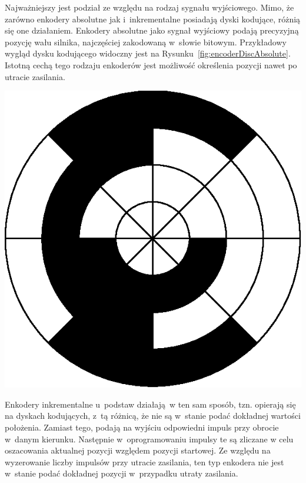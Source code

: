 Najważniejszy jest podział ze względu na rodzaj sygnału wyjściowego. Mimo, że zarówno enkodery absolutne jak i~inkrementalne posiadają dyski kodujące, różnią się one działaniem. Enkodery absolutne jako sygnał wyjściowy podają precyzyjną pozycję wału silnika, najczęściej zakodowaną w~słowie bitowym. Przykładowy wygląd dysku kodującego widoczny jest na Rysunku~\ref{fig:encoderDiscAbsolute}. Istotną cechą tego rodzaju enkoderów jest możliwość określenia pozycji nawet po utracie zasilania.

\begin{center}
\includegraphics[scale=1]{images/encoderDiscAbsolute.eps}
\label{fig:encoderDiscAbsolute}
\end{center}

Enkodery inkrementalne u~podstaw działają~w ten sam sposób, tzn. opierają się na dyskach kodujących, z~tą różnicą, że nie są w~stanie podać dokładnej wartości położenia. Zamiast tego, podają na wyjściu odpowiedni impuls przy obrocie w~danym kierunku. Następnie w~oprogramowaniu impulsy te są zliczane w celu oszacowania aktualnej pozycji względem pozycji startowej. Ze względu na wyzerowanie liczby impulsów przy utracie zasilania, ten typ enkodera nie jest w~stanie podać dokładnej pozycji w~przypadku utraty zasilania.

